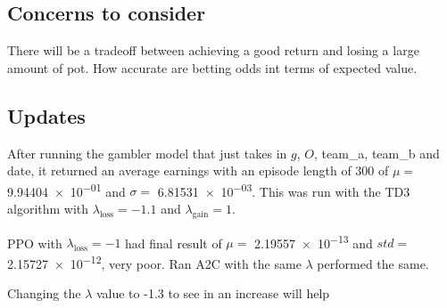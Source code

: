 \documentclass{article}
\begin{document}
    \subsection*{Concerns to consider}
        There will be a tradeoff between achieving a good return and losing a large amount of pot.
        How accurate are betting odds int terms of expected value.


    \subsection*{Updates}
        After running the gambler model that just takes in $g$, $O$, team\_a, team\_b and date, it returned an average earnings with an episode length of 300 of $\mu =$ \num{9.94404e-01} and $\sigma =$ \num{6.81531e-03}.
        This was run with the TD3 algorithm with $\lambda_{\text{loss}} = -1.1$ and $\lambda_{\text{gain}} = 1$.

        PPO with $\lambda_{\text{loss}} = -1$ had final result of $\mu=$ \num{2.19557e-13} and
        $std=$ \num{2.15727e-12}, very poor.
        Ran A2C with the same $\lambda$ performed the same.

        Changing the $\lambda$ value to -1.3 to see in an increase will help
\end{document}
